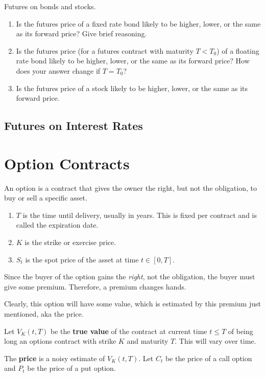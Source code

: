 \documentclass{article}
\begin{document}
    \begin{exercise}[Blyth 5.2]
      Futures on bonds and stocks. 
      \begin{enumerate}
        \item Is the futures price of a fixed rate bond likely to be higher, lower, or the same as its forward price? Give brief reasoning. 
        \item Is the futures price (for a futures contract with maturity $T < T_0$) of a floating rate bond likely to be higher, lower, or the same as its forward price? How does your answer change if $T = T_0$? 
        \item Is the futures price of a stock likely to be higher, lower, or the same as its forward price. 
      \end{enumerate}
    \end{exercise}

  \subsection{Futures on Interest Rates}

\section{Option Contracts}

    \begin{definition}[Options]
      \label{def:options}
      An option is a contract that gives the owner the right, but not the obligation, to buy or sell a specific asset. 
      \begin{enumerate}
        \item $T$ is the time until delivery, usually in years. This is fixed per contract and is called the expiration date. 
        \item $K$ is the strike or exercise price. 
        \item $S_t$ is the spot price of the asset at time $t \in [0, T]$. 
      \end{enumerate}
      Since the buyer of the option gains the \textit{right}, not the obligation, the buyer must give some premium. Therefore, a premium changes hands. 
    \end{definition}

    Clearly, this option will have some value, which is estimated by this premium just mentioned, aka the price. 

    \begin{definition}[Value]
      \label{def:value}
      Let $V_K (t, T)$ be the \textbf{true value} of the contract at current time $t \leq T$ of being long an options contract with strike $K$ and maturity $T$. This will vary over time. 

      The \textbf{price} is a noisy estimate of $V_K (t, T)$. Let $C_t$ be the price of a call option and $P_t$ be the price of a put option.
    \end{definition}
\end{document}
